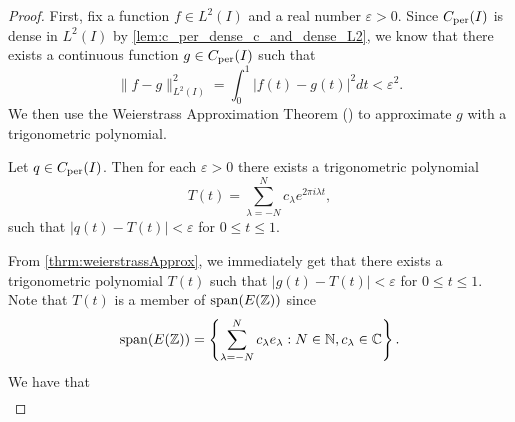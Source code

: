 \documentclass[../thesis.tex]{subfiles}
\begin{document}
\begin{proof}
    First, fix a function $f\in L^2(I)$ and a real number $\varepsilon >0$. Since $C_{\text{per}}(I)$ is dense in $L^2(I)$ by \cref{lem:c_per_dense_c_and_dense_L2}, we know that there exists a continuous function $g \in C_{\text{per}}(I)$ such that
    \begin{equation}\label{eq:estimate_1}
        \| f-g \|_{L^2(I)}^2 = \int_0^1 \left|f(t)-g(t) \right|^2dt < \varepsilon^2.
    \end{equation}
    We then use the Weierstrass Approximation Theorem (\cite[p.~202]{durenInvitationClassicalAnalysis2012}) to approximate $g$ with a trigonometric polynomial. 
    \begin{theorem}\label{thrm:weierstrassApprox}
        Let $q\in C_{\text{per}} (I)$. Then for each $\varepsilon>0$ there exists a trigonometric polynomial %
        \begin{equation*}
            T(t) = \sum_{\lambda=-N}^N c_\lambda e^{2\pi i \lambda t},
        \end{equation*}
        such that $|q(t)-T(t)|<\varepsilon$ for $0 \leq t \leq 1$.
    \end{theorem}
    From \cref{thrm:weierstrassApprox}, we immediately get that there exists a trigonometric polynomial $T(t)$ such that $|g(t)-T(t)|<\varepsilon$ for $0 \leq t \leq 1$. Note that $T(t)$ is a member of $\operatorname{span}(E(\mathbb{Z}))$ since %
    \begin{equation*}
        \operatorname{span}(E(\mathbb{Z}))=\left\{\sum_{\lambda=-N}^N c_\lambda e_\lambda : N \in \mathbb{N}, c_\lambda \in \mathbb{C}\right\}.
    \end{equation*}
    We have that
    \begin{align}\label{eq:estimate_2}

\end{align}
\end{proof}
\end{document}

